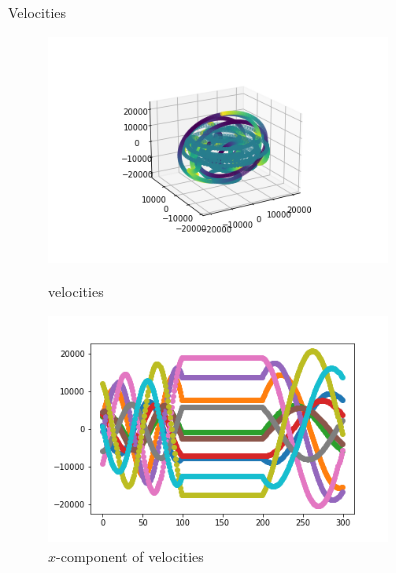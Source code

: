 \documentclass[12pt]{article}
\begin{document}
	Velocities
	\begin{figure}[H]
		\begin{multicols}{2}
			\includegraphics[width=\linewidth, height=6cm]{multivs2.png} \caption{velocities} \label{multivs2} \par
			\includegraphics[width=\linewidth, height=6cm]{multivsx2.png} \caption{$x$-component of velocities} \label{multivsx2} \par
		\end{multicols}
	\end{figure}
\end{document}
